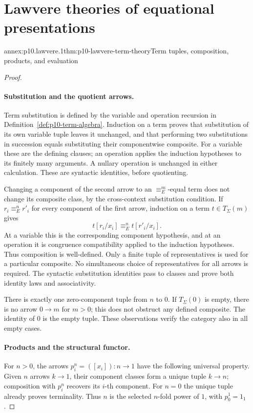 
\section{Lawvere theories of equational presentations}

\begin{annexitem}{annex:p10.lawvere.1}{thm:p10-lawvere-term-theory}{Term tuples, composition, products, and evaluation}
\begin{proof}
\paragraph{Substitution and the quotient arrows.}
Term substitution is defined by the variable and operation
recursion in Definition~\ref{def:p10-term-algebra}.
Induction on a term proves that substitution of its own variable
tuple leaves it unchanged, and that performing two substitutions
in succession equals substituting their componentwise composite.
For a variable these are the defining clauses; an operation
applies the induction hypotheses to its finitely many arguments.
A nullary operation is unchanged in either calculation.
These are syntactic identities, before quotienting.

Changing a component of the second arrow to an
\(\equiv_E^m\)-equal term does not change its composite class,
by the cross-context substitution condition.
If \(r_i\equiv_E^n r'_i\) for every component of the first
arrow, induction on a term \(t\in T_\Sigma(m)\) gives
\[
                         t[r_i/x_i]\equiv_E^n t[r'_i/x_i].
\]
At a variable this is the corresponding component hypothesis,
and at an operation it is congruence compatibility applied
to the induction hypotheses.  Thus composition is well-defined.
Only a finite tuple of representatives is used for a
particular composite.  No simultaneous choice of representatives
for all arrows is required.
The syntactic substitution identities pass to classes and
prove both identity laws and associativity.

There is exactly one zero-component tuple from \(n\) to \(0\).
If \(T_\Sigma(0)\) is empty, there is no arrow \(0\to m\)
for \(m>0\); this does not obstruct any defined composite.
The identity of \(0\) is the empty tuple.
These observations verify the category also in all empty cases.

\paragraph{Products and the structural functor.}
For \(n>0\), the arrows \(p_i^n=([x_i]):n\to1\) have the
following universal property.  Given \(n\) arrows \(k\to1\),
their component classes form a unique tuple \(k\to n\);
composition with \(p_i^n\) recovers its \(i\)-th component.
For \(n=0\) the unique tuple already proves terminality.
Thus \(n\) is the selected \(n\)-fold power of \(1\), with
\(p_0^1=1_1\).


\end{proof}
\end{annexitem}
